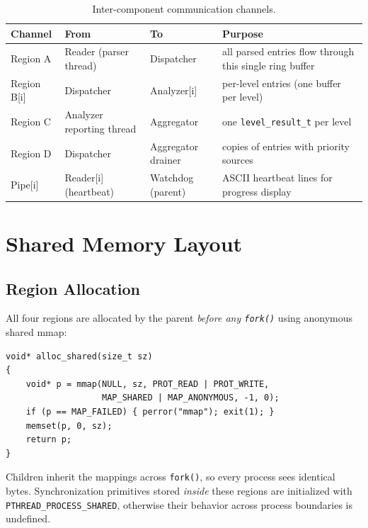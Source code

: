 \documentclass[11pt,a4paper]{article}
\newcommand{\code}[1]{\texttt{\small #1}}
\begin{document}
\begin{table}[H]
\centering
\small
\renewcommand{\arraystretch}{1.25}
\begin{tabularx}{\textwidth}{@{}l l l X@{}}
\toprule
\rowcolor{primary!15}
\textbf{Channel} & \textbf{From} & \textbf{To} & \textbf{Purpose} \\
\midrule
Region A      & Reader (parser thread)            & Dispatcher        & all parsed entries flow through this single ring buffer \\
Region B[i]   & Dispatcher                        & Analyzer[i]       & per-level entries (one buffer per level) \\
Region C      & Analyzer reporting thread         & Aggregator        & one \code{level\_result\_t} per level \\
Region D      & Dispatcher                        & Aggregator drainer& copies of entries with priority sources \\
Pipe[i]       & Reader[i] (heartbeat)             & Watchdog (parent) & ASCII heartbeat lines for progress display \\
\bottomrule
\end{tabularx}
\caption{Inter-component communication channels.}
\end{table}

\section{Shared Memory Layout}

\subsection{Region Allocation}

All four regions are allocated by the parent \emph{before any
\code{fork()}} using anonymous shared mmap:

\begin{lstlisting}[style=Cstyle]
void* alloc_shared(size_t sz)
{
    void* p = mmap(NULL, sz, PROT_READ | PROT_WRITE,
                   MAP_SHARED | MAP_ANONYMOUS, -1, 0);
    if (p == MAP_FAILED) { perror("mmap"); exit(1); }
    memset(p, 0, sz);
    return p;
}
\end{lstlisting}

Children inherit the mappings across \code{fork()}, so every process sees
identical bytes. Synchronization primitives stored \emph{inside} these
regions are initialized with \code{PTHREAD\_PROCESS\_SHARED}, otherwise
their behavior across process boundaries is undefined.
\end{document}
